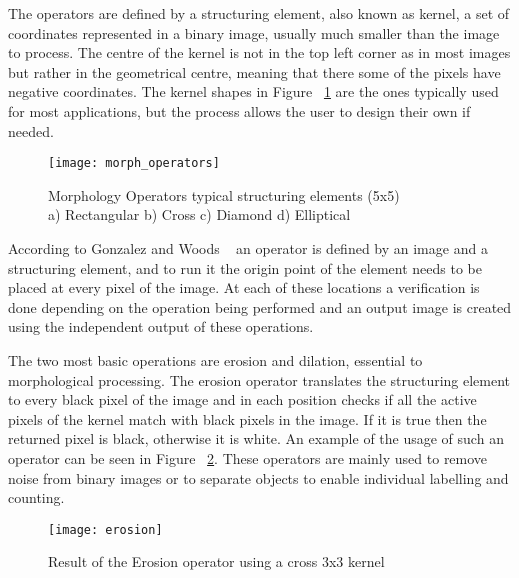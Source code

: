 The operators are defined by a structuring element, also known as kernel, a set of coordinates represented in a binary image, usually much smaller than the image to process. The centre of the kernel is not in the top left corner as in most images but rather in the geometrical centre, meaning that there some of the pixels have negative coordinates. The kernel shapes in Figure ~\ref{fig:morh_operators} are the ones typically used for most applications, but the process allows the user to design their own if needed.

\begin{figure}[h]
  \begin{center}
    \leavevmode
    \texttt{[image: morph\_operators]}
    \captionsetup{justification=centering}
    \caption{Morphology Operators typical structuring elements (5x5)\\a) Rectangular b) Cross c) Diamond d) Elliptical}
    \label{fig:morh_operators}
  \end{center}
\end{figure}

According to Gonzalez and Woods ~\cite{gonzalez_digital_1992} an operator is defined by an image and a structuring element, and to run it the origin point of the element needs to be placed at every pixel of the image. At each of these locations a verification is done depending on the operation being performed and an output image is created using the independent output of these operations.

The two most basic operations are erosion and dilation, essential to morphological processing. The erosion operator translates the structuring element to every black pixel of the image and in each position checks if all the active pixels of the kernel match with black pixels in the image. If it is true then the returned pixel is black, otherwise it is white. An example of the usage of such an operator can be seen in Figure ~\ref{fig:erosion}. These operators are mainly used to remove noise from binary images or to separate objects to enable individual labelling and counting.

\begin{figure}[h]
  \begin{center}
    \leavevmode
    \texttt{[image: erosion]}
    \captionsetup{justification=centering}
    \caption{Result of the Erosion operator using a cross 3x3 kernel}
    \label{fig:erosion}
  \end{center}
\end{figure}

